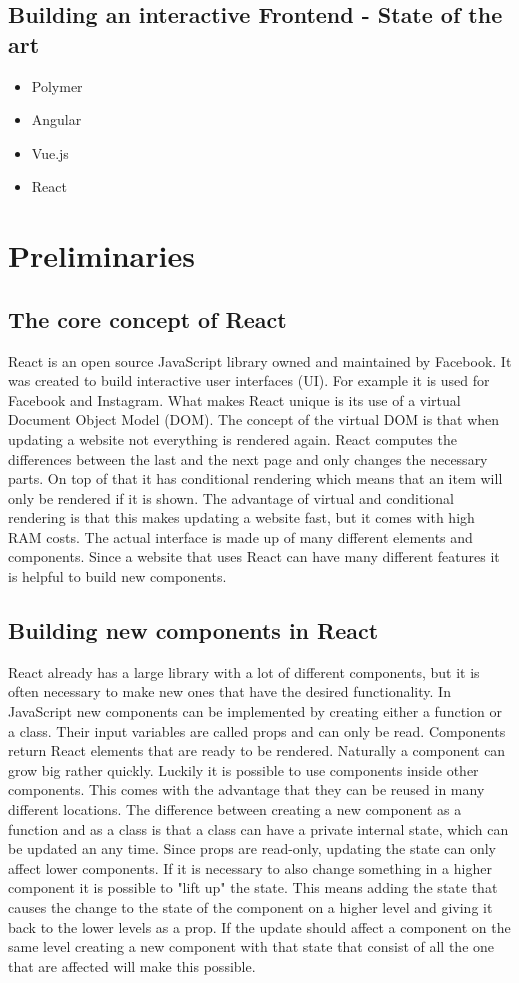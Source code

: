 \documentclass[11pt,a4paper]{article}
\begin{document}
	\subsection{Building an interactive Frontend - State of the art}
	\begin{itemize}
	\item Polymer
	\item Angular
	\item Vue.js
	\item React
	\end{itemize}

\section{Preliminaries}
	\subsection{The core concept of React} 
	React is an open source JavaScript library owned and maintained by Facebook.	It was created to build interactive user interfaces (UI). For example it is used for Facebook and Instagram. What makes React unique is its use of a virtual Document Object Model (DOM). The concept of the virtual DOM is that when updating a website not everything is rendered again. React computes the differences between the last and the next page and only changes the necessary parts. On top of that it has conditional rendering which means that an item will only be rendered if it is shown. The advantage of virtual and conditional rendering is that this makes updating a website fast, but it comes with high RAM costs. The actual interface is made up of many different elements and components. Since a website that uses React can have many different features it is helpful to build new components.
	
	
	\subsection{Building new components in React}
	React already has a large library with a lot of different components, but it is often necessary to make new ones that have the desired functionality. In JavaScript new components can be implemented by creating either a function or a class. Their input variables are called props and can only be read. Components return React elements that are ready to be rendered. Naturally a component can grow big rather quickly. Luckily it is possible to use components inside other components. This comes with the advantage that they can be reused in many different locations. The difference between creating a new component as a function and as a class is that a class can have a private internal state, which can be updated an any time. Since props are read-only, updating the state can only affect lower components. If it is necessary to also change something in a higher component it is possible to "lift up" the state. This means adding the state that causes the change to the state of the component on a higher level and giving it back to the lower levels as a prop. If the update should affect a component on the same level creating a new component with that state that consist of all the one that are affected will  make this possible.
\end{document}

